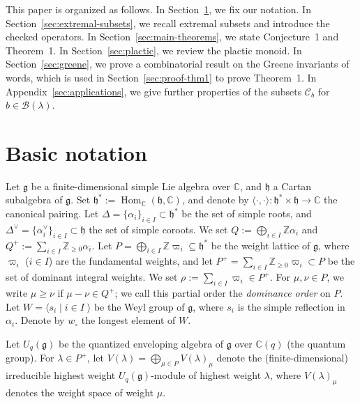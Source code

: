 \documentclass[reqno]{amsart}
\theoremstyle{definition}
\theoremstyle{remark}
\numberwithin{equation}{section}
\newcommand{\g}{\mathfrak{g}}
\newcommand{\B}{\mathcal{B}}
\newcommand{\Hom}{\operatorname{Hom}}
\newcommand{\Bl}{\B(\lambda)}
\begin{document}
This paper is organized as follows.
In Section~\ref{sec:preliminaries}, we fix our notation.
In Section~\ref{sec:extremal-subsets}, we recall extremal subsets and introduce the checked operators.
In Section~\ref{sec:main-theorems}, we state Conjecture~1 and Theorem~1.
In Section~\ref{sec:plactic}, we review the plactic monoid.
In Section~\ref{sec:greene}, we prove a combinatorial result on the Greene invariants of words,
which is used in Section~\ref{sec:proof-thm1} to prove Theorem~1.
In Appendix~\ref{sec:applications}, we give further properties of the subsets $\mathcal{C}_b$ for $b\in\Bl$.

	\section{Basic notation}\label{sec:preliminaries}
	
	Let $\mathfrak{g}$ be a finite-dimensional simple Lie algebra over $\mathbb{C}$, 
	and $\mathfrak{h}$ a Cartan subalgebra of $\mathfrak{g}$.
	Set $\mathfrak{h}^*:=\Hom_\mathbb{C}\left(\mathfrak{h},\mathbb{C}\right)$, 
	and denote by $\langle \cdot,\cdot\rangle:\mathfrak{h}^\ast\times\mathfrak{h}\to\mathbb{C}$ the canonical pairing.
	Let
	$\Delta=\{\alpha_i\}_{i\in I}\subset\mathfrak{h}^*$ be the set of simple roots, and
	$\Delta^\lor=\{\alpha_i^\lor\}_{i\in I}\subset\mathfrak{h}$ the set of simple coroots.
	We set $Q:=\bigoplus_{i\in I}\mathbb{Z}\alpha_i$ and $Q^+:=\sum_{i\in I}\mathbb{Z}_{\ge 0}\alpha_i$. 
	Let $P=\bigoplus_{i\in I}\mathbb{Z}\varpi_i\subseteq\mathfrak{h}^*$ be the weight lattice of $\mathfrak{g}$, where $\varpi_i$ ($i\in I$) are the fundamental weights,
	and let $P^+=\sum_{i\in I}\mathbb{Z}_{\ge 0}\varpi_i\subset P$ be the set of dominant integral weights.
	We set $\rho:=\sum_{i\in I}\varpi_i\in P^+$.
	For $\mu,\nu\in P$,
	we write $\mu\ge\nu$ if $\mu-\nu\in Q^+$;
	we call this partial order the \emph{dominance order} on $P$.
	Let $W=\langle s_i \mid{i\in I}\;\rangle$ be the Weyl group of $\g$, where $s_i$ is the simple reflection in $\alpha_i$.
	Denote by $w_\circ$ the longest element of $W$.
	
	Let $U_q(\g)$ be the quantized enveloping algebra of $\g$ over $\mathbb{C}(q)$
	(the quantum group). For $\lambda \in P^{+}$, let $V(\lambda) = \bigoplus_{\mu \in P} V(\lambda)_\mu$ denote the (finite-dimensional)
	irreducible highest weight $U_q(\g)$-module of highest weight $\lambda$,
	where $V(\lambda)_\mu$ denotes the weight space of weight $\mu$.
	
\end{document}
